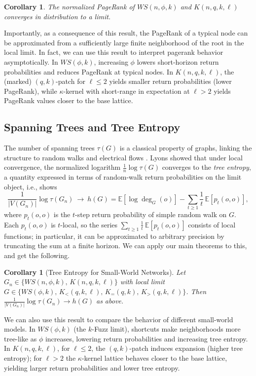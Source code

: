 \documentclass[10pt]{amsart}
\newtheorem{corollary}[theorem]{Corollary}
\begin{document}
\begin{corollary}
    The normalized PageRank of $WS(n, \phi, k)$ and $K(n, q, k, \ell)$ converges in distribution to a limit. 
\end{corollary} 

Importantly, as a consequence of this result, the PageRank of a typical node
can be approximated from a sufficiently large finite neighborhood of the root
in the local limit.
In fact, we can use this result to interpret pagerank behavior asymptotically.
In $WS(\phi,k)$, increasing $\phi$ lowers short-horizon return probabilities and reduces PageRank at typical nodes.
In $K(n,q,k,\ell)$, the (marked) $(q,k)$-patch for $\ell\le 2$ yields smaller return probabilities (lower PageRank), while $\kappa$-kernel with short-range in expectation at $\ell>2$ yields PageRank values closer to the base lattice.

\subsection{Spanning Trees and Tree Entropy}
The number of spanning trees $\tau(G)$ is a classical property of graphs, linking the structure to random walks and electrical flows \cite{lyons2017probability}. Lyons \cite{Lyons2005} showed that under local convergence, the normalized logarithm $\tfrac{1}{n}\log\tau(G)$ converges to the \emph{tree entropy}, a quantity expressed in terms of random-walk return probabilities on the limit object, i.e.,  \cite[Theorem.~3.3]{Lyons2005} shows
\[
\frac{1}{|V(G_n)|}\log \tau(G_n)\ \longrightarrow\ h(G)
=\mathbb{E}[\log \deg_{G}(o)]-\sum_{t\ge 1}\frac{1}{t}\,\mathbb{E}[p_t(o,o)],
\]
where $p_t(o,o)$ is the $t$-step return probability of simple random walk on $G$. Each \( p_t(o,o) \) is \( t \)-local, so the series \( \sum_{t \ge 1} \frac{1}{t}\,\mathbb{E}[p_t(o,o)] \) consists of local functions; in particular, it can be approximated to arbitrary precision by truncating the sum at a finite horizon. We can apply our main theorems to this, and get the following.

\begin{corollary}[Tree Entropy for Small-World Networks]\label{cor:tree}
Let $G_n\in\{WS(n,\phi,k),\,K(n,q,k,\ell)\}$ with local limit $G\in\{WS(\phi,k),\,K_{<}(q,k,\ell),\,K_{=}(q,k),\,K_{>}(q,k,\ell)\} $.
Then $\tfrac{1}{|V(G_n)|}\log \tau(G_n)\to h(G)$ as above.
\end{corollary}

We can also use this result to compare the behavior of different small-world models. In $WS(\phi,k)$ (the $k$-Fuzz limit), shortcuts make neighborhoods more tree-like as $\phi$ increases, lowering return probabilities and increasing tree entropy. 
In $K(n,q,k,\ell)$, for $\ell\le 2$, the $(q,k)$-patch induces expansion (higher tree entropy); for $\ell>2$ the $\kappa$-kernel lattice behaves closer to the base lattice, yielding larger return probabilities and lower tree entropy.
\end{document}
